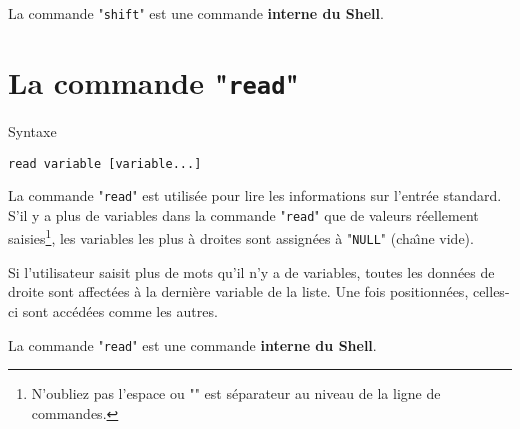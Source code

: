 La commande "\texttt{shift}" est une commande \textbf{interne du Shell}.

\section{La commande "\texttt{read}"}

\begin{definition}{Syntaxe}
\begin{verbatim}
read variable [variable...]
\end{verbatim}
\end{definition}

La commande "\texttt{read}" est utilis{\'e}e pour lire les informations sur
l{'}entr{\'e}e standard. S'il y a plus de variables dans la commande
"\texttt{read}" que de valeurs r{\'e}ellement saisies\footnote{N'oubliez pas
l'espace ou "\spacekey{}" est s{\'e}parateur au niveau de la ligne
de commandes.}, les variables les plus {\`a} droites sont assign{\'e}es {\`a}
"\texttt{NULL}" (cha{\^\i}ne vide).

Si l'utilisateur saisit plus de mots qu'il n'y a de variables, toutes les donn{\'e}es
de droite sont affect{\'e}es {\`a} la derni{\`e}re variable de la liste.
Une fois positionn{\'e}es, celles-ci sont acc{\'e}d{\'e}es comme les autres.

La commande "\texttt{read}" est une commande \textbf{interne du Shell}.

